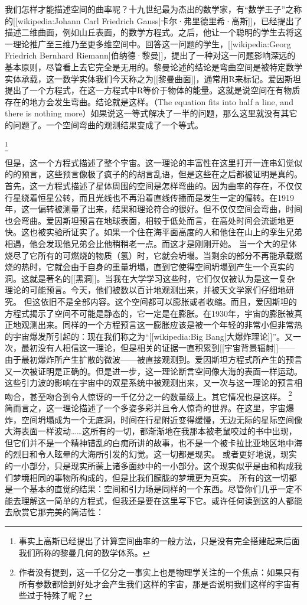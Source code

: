     我们怎样才能描述空间的曲率呢？十九世纪最为杰出的数学家，有“数学王子”之称的[[wikipedia:Johann Carl Friedrich Gauss|卡尔·弗里德里希·高斯]]，已经提出了描述二维曲面，例如山丘表面，的数学方程式。之后，他让一个聪明的学生去将这一理论推广至三维乃至更多维空间中。回答这一问题的学生，[[wikipedia:Georg Friedrich Bernhard Riemann|伯纳德·黎曼]]，提出了一种对这一问题影响深远的基本原则，尽管看上去它完全是无用的。黎曼论述的结论是弯曲空间是被特定数学实体承载，这一数学实体我们今天称之为[[黎曼曲面]]，通常用R来标记。爱因斯坦提出了一个方程式，在这一方程式中R等价于物体的能量。这就是说空间在有物质存在的地方会发生弯曲。结论就是这样。（The equation fits into half a line, and there is nothing more）如果说这一等式解决了一半的问题，那么这里就没有其它的问题了。一个空间弯曲的观测结果变成了一个等式。

\footnote[4]
{
事实上高斯已经提出了计算空间曲率的一般方法，只是没有完全搭建起来后面我们所称的黎曼几何的数学体系。
}

    但是，这一个方程式描述了整个宇宙。这一理论的丰富性在这里打开一连串幻觉似的的预言，这些预言像极了疯子的的胡言乱语，但是这些在之后都被证明是真的。
    首先，这一方程式描述了星体周围的空间是怎样弯曲的。因为曲率的存在，不仅仅行星绕着恒星公转，而且光线也不再沿着直线传播而是发生一定的偏转。在1919年，这一偏转被测量了出来，结果和理论符合的很好。但不仅仅空间会弯曲，时间也会弯曲。爱因斯坦预言在地球表面，相较于低处而言，在高处时间会流逝地更快。这也被实验所证实了。如果一个住在海平面高度的人和他住在山上的孪生兄弟相遇，他会发现他兄弟会比他稍稍老一点。而这才是刚刚开始。
    当一个大的星体烧尽了它所有的可燃烧的物质（氢）时，它就会坍塌。当剩余的部分不再能承载燃烧的热时，它就会由于自身的重量坍塌，直到它使得空间坍塌到产生一个真实的洞。这就是著名的[[黑洞]]。当我在大学学习这些时，它们仅仅被认为是这一复杂理论的可能预言。今天，他们被数以百计地观测出来，并被天文学家们仔细地研究。
    但这依旧不是全部内容。这个空间都可以膨胀或者收缩。而且，爱因斯坦的方程式揭示了空间不可能是静态的，它一定是在膨胀。在1930年，宇宙的膨胀被真正地观测出来。同样的一个方程预言这一膨胀应该是被一个年轻的非常小但非常热的宇宙爆发所引起的：现在我们称之为“[[wikipedia:Big Bang|大爆炸理论]]”。又一次，最初没有人相信这一理论，但是相关的证据一直积累到[[宇宙背景辐射]]——由于最初爆炸所产生扩散的微波——被直接观测到。爱因斯坦方程式所产生的预言又一次被证明是正确的。但是进一步，这一理论断言空间像大海的表面一样运动。这些引力波的影响在宇宙中的双星系统中被观测出来，又一次与这一理论的预言相吻合，甚至吻合到令人惊讶的一千亿分之一的数量级上。其它情况也是这样。
\footnote[5]
{
作者没有提到，这一千亿分之一事实上也是物理学关注的一个焦点：如果只有所有参数都恰到好处才会产生我们这样的宇宙，那是否说明我们这样的宇宙有些过于特殊了呢？
}
    简而言之，这一理论描述了一个多姿多彩并且令人惊奇的世界。在这里，宇宙爆炸，空间坍塌成为一个无底洞，时间在行星附近变得缓慢，无边无际的星际空间像大海表面一样波动……这所有的一切，都渐渐地在我那本被老鼠咬过的书中出现，但它们并不是一个精神错乱的白痴所讲的故事，也不是一个被卡拉比亚地区地中海的烈日和令人眩晕的大海所引发的幻觉。这一切都是现实。
    或者更好地说，现实的一小部分，只是现实所蒙上诸多面纱中的一小部分。这个现实似乎是由和构成我们梦境相同的事物所构成的，但是比我们朦胧的梦境更为真实。
    所有的这一切都是一个基本的直觉的结果：空间和引力场是同样的一个东西。尽管你们几乎一定不能去理解这一简单的方程式，但我还是要在这里写下它。或许任何读到这的人都能去欣赏它那完美的简洁性：
    
